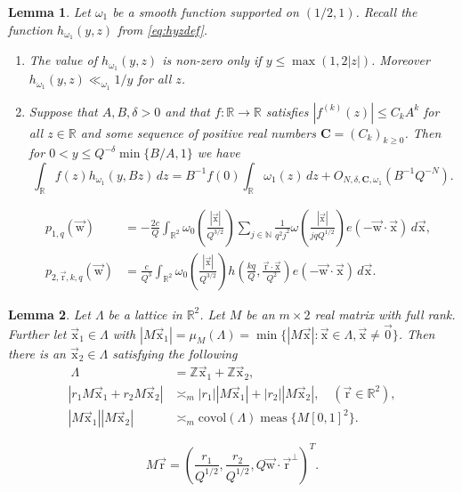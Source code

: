 \documentclass[10pt,a4paper]{amsart}
\newtheorem{lemma}{Lemma}
\newcommand{\NN}{\mathbb{N}}
\newcommand{\R}{\mathbb{R}}
\newcommand{\RR}{\mathbb{R}}
\newcommand{\Z}{\mathbb{Z}}
\DeclareMathOperator{\meas}{meas}
\newcommand{\ur}{\vec{\mathrm{r}}}
\newcommand{\uw}{{\vec{\mathrm{w}}}}
\newcommand{\ux}{{\vec{\mathrm{x}}}}
\begin{document}
\begin{lemma}\label{lem:HB}
	Let $\omega_1$ be a
    smooth function supported on $(1/2, 1)$. Recall the function $h_{\omega_1}(y,z)$ from \eqref{eq:hyzdef}.
    \begin{enumerate}
        \item 
    The value of $h_{\omega_1}(y,z)$ is non-zero only if  $y\leq \max (1, 2|z|)$. Moreover $h_{\omega_1}(y,z)\ll_{\omega_1} 1/y$ for all $z$.
    \item
    Suppose that \(A,B, \delta>0\) and that \(f:\R\to \R\) satisfies \(|f^{(k)}(z)|\leq C_k A^k\) for all \(z\in \R\) and some sequence of positive real numbers \(\boldsymbol{C}=(C_k)_{k\geq 0}\). 
    Then for \(0<y\leq Q^{-\delta}\min\{B/A,1\}\) we have
	\[
	\int_{\R} f(z)h_{\omega_1}(y,Bz)\,dz
	= B^{-1}f(0)\int_{\R}\omega_1(z)\,dz
	+O_{N,\delta,\boldsymbol{C},\omega_1}(B^{-1}Q^{-N}).
	\]
    \end{enumerate}
\end{lemma}

		\begin{align}
		\label{defp2}\quad
			p_{1,q}(\uw)
			&=
			-\frac{2c}{Q}
			\int_{\R^2} 
			\omega_0\left(\frac{|\ux|}{Q^{3/2}}\right)
			\sum_{j\in\NN}
			\frac{1}{q^2j^2}
			\omega
			\left(\frac{|\ux|}{jqQ^{1/2}}
			\right)
			e(-\uw\cdot \ux)
			\,d\ux,\\
				\label{defp1}\quad
				p_{2,\ur,k,q}(\uw)
				&=\frac{c}{Q^3}
				\int_{\R^2} 
				\omega_0\left(\frac{|\ux|}{Q^{3/2}}\right)
				h\left(
				\frac{kq}{Q},
				\frac{\ur\cdot \ux }{ Q^2}
				\right)
				e(-\uw\cdot \ux)
				\,d\ux.
	\end{align}

\begin{lemma}\label{lem:minkowski_basis}
	Let $\Lambda$ be a lattice in $\RR^2$.
	Let \(M\) be an \(m \times 2\) real matrix with full rank. Further let 
	\( \ux_1 \in \Lambda \) with \(|M\ux_1| = \mu_M(\Lambda )=\min\{ |M\ux| : \ux \in \Lambda, \ux \neq\vec{0}\}\). Then there is an \(\ux_2\in \Lambda \) satisfying the following
	\begin{align*}\
	\Lambda & = \Z \ux_1 + \Z \ux_2,
	\\
	| r_1 M\ux_1 + r_2 M\ux_2 |
	&\asymp_m |r_1||M\ux_1| + |r_2| |M\ux_2|,
	\quad (\ur\in\R^2),
	\\
	|  M\ux_1 || M\ux_2 |
	&\asymp_m
	\mathrm{covol}(\Lambda)\meas\{ M [0,1]^2 \}.
	\end{align*}
\end{lemma}

	\begin{equation}\label{def:Mmatrdef_0}
		M\ur
		=
		\left(\frac{r_1}{Q^{1/2}},
		\frac{r_2}{Q^{1/2}},
		Q\uw\cdot \ur^\perp\right)^T.
	\end{equation}
\end{document}
